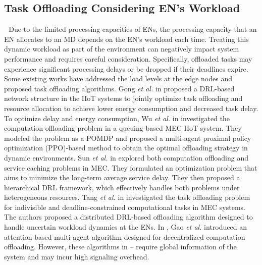 \documentclass[12pt,draftclsnofoot,onecolumn]{IEEEtran}
\newenvironment{my}[2]%
{\begin{list}{}%
{\setlength{\rightmargin}{#1}\setlength{\leftmargin}{#2}}%


 \item[]{}

} {\end{list}}
\begin{document}
\begin{enumerate}
\begin{my}{1cm}{1cm}
{		\subsection{Task Offloading Considering EN's Workload}
		\,\,\,\,Due to the limited processing capacities of ENs, the processing capacity that an EN allocates to an MD depends on the EN's workload each time. Treating this dynamic workload as part of the environment can negatively impact system performance and requires careful consideration. Specifically, offloaded tasks may experience significant processing delays or be dropped if their deadlines expire. Some existing works have addressed the load levels at the edge nodes and proposed task offloading algorithms.
		Gong \textit{et al.} in \cite{gong2022edge} proposed a DRL-based network structure in the IIoT systems to jointly optimize task offloading and resource allocation to achieve lower energy consumption and decreased task delay.
		To optimize delay and energy consumption, Wu \textit{et al.} in \cite{wu2023multi} investigated the computation offloading problem in a queuing-based MEC IIoT system. They modeled the problem as a POMDP and proposed a multi-agent proximal policy optimization (PPO)-based method to obtain the optimal offloading strategy in dynamic environments.
		Sun \textit{et al.} in \cite{sun2024hierarchical} explored both computation offloading and service caching problems in MEC. They formulated an optimization problem that aims to minimize the long-term average service delay. They then proposed a hierarchical DRL framework, which effectively handles both problems under heterogeneous resources.
		Tang \textit{et al.} in \cite{9253665} investigated the task offloading problem for indivisible and deadline-constrained computational tasks in MEC systems. The authors proposed a distributed DRL-based offloading algorithm designed to handle uncertain workload dynamics at the ENs. 
		In \cite{gao2022large}, Gao \textit{et al.} introduced an attention-based multi-agent algorithm designed for decentralized computation offloading.
		However, these algorithms in \cite{gong2022edge}–\cite{gao2022large} require global information of the system and may incur high signaling overhead.}
\end{my}



\end{enumerate}
\end{document}
